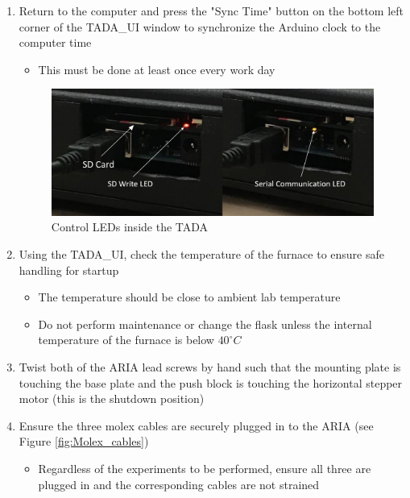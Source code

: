 \documentclass[letterpaper,11pt]{article}
\begin{document}
\begin{enumerate}
    \item Return to the computer and press the "Sync Time" button on the bottom 
        left corner of the TADA\_UI
        window to synchronize the Arduino clock to the computer time
        \begin{itemize}
        \item This must be done at least once every work day
        \end{itemize}

\begin{figure}[H]
	\centering
	\includegraphics[width=.75\textwidth]{led_red_yellow.jpg}
	\caption{Control LEDs inside the TADA}
	\label{fig:tada_leds}
\end{figure}

    \item Using the TADA\_UI, check the temperature of the furnace to ensure safe handling for 
        startup
        \begin{itemize}
        \item The temperature should be close to ambient lab temperature
        \item Do not perform maintenance or change the flask unless the internal temperature of the 
			furnace is below $40^\circ C$
        \end{itemize}
    \item Twist both of the ARIA lead screws by hand such that the mounting 
        plate is touching the base plate and the push block is touching the 
        horizontal stepper motor (this is the shutdown position) %
    \item Ensure the three molex cables are securely plugged in to the ARIA (see Figure \ref{fig:Molex_cables})
		\begin{itemize}
		\item Regardless of the experiments to be performed, ensure all three are plugged in and the 
			corresponding cables are not strained
		\end{itemize}
        

\end{enumerate}
\end{document}
